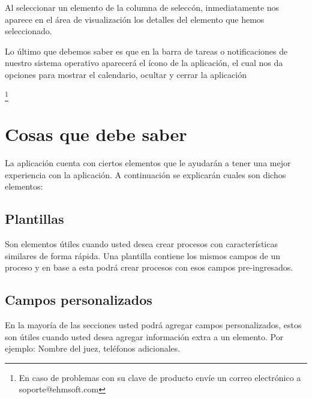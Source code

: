 Al seleccionar un elemento de la columna de selecc\'on, inmediatamente nos aparece en el \'area de visualizaci\'on los detalles del elemento que hemos seleccionado.

Lo \'ultimo que debemos saber es que en la barra de tareas o notificaciones de nuestro sistema operativo aparecer\'a el \'icono de la aplicaci\'on, el cual nos da opciones para mostrar el calendario, ocultar y cerrar la aplicaci\'on

\footnote{En caso de problemas con su clave de producto env\'ie un correo
electr\'onico a \mbox{soporte@ehmsoft.com}}


\section{Cosas que debe saber}
La aplicaci\'on cuenta con ciertos elementos que le ayudar\'an a tener una
mejor experiencia con la aplicaci\'on. A continuaci\'on se explicar\'an cuales
son dichos elementos:


\subsection{Plantillas}
Son elementos \'utiles cuando usted desea crear procesos con
caracter\'isticas similares de forma r\'apida. Una plantilla contiene los mismos
campos de un proceso y en base a esta podr\'a crear procesos con esos campos
pre-ingresados.
\subsection{Campos personalizados}
En la mayor\'ia de las secciones usted podr\'a agregar campos personalizados, estos son
\'utiles cuando usted desea agregar informaci\'on extra a un elemento. Por
ejemplo: Nombre del juez, tel\'efonos adicionales.
